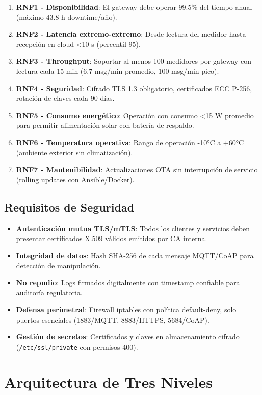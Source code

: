 \begin{enumerate}
    \item \textbf{RNF1 - Disponibilidad}: El gateway debe operar 99.5\% del tiempo anual (máximo 43.8 h downtime/año).
    \item \textbf{RNF2 - Latencia extremo-extremo}: Desde lectura del medidor hasta recepción en cloud <10 s (percentil 95).
    \item \textbf{RNF3 - Throughput}: Soportar al menos 100 medidores por gateway con lectura cada 15 min (6.7 msg/min promedio, 100 msg/min pico).
    \item \textbf{RNF4 - Seguridad}: Cifrado TLS 1.3 obligatorio, certificados ECC P-256, rotación de claves cada 90 días.
    \item \textbf{RNF5 - Consumo energético}: Operación con consumo <15 W promedio para permitir alimentación solar con batería de respaldo.
    \item \textbf{RNF6 - Temperatura operativa}: Rango de operación -10°C a +60°C (ambiente exterior sin climatización).
    \item \textbf{RNF7 - Mantenibilidad}: Actualizaciones OTA sin interrupción de servicio (rolling updates con Ansible/Docker).
\end{enumerate}

\subsection{Requisitos de Seguridad}

\begin{itemize}
    \item \textbf{Autenticación mutua TLS/mTLS}: Todos los clientes y servicios deben presentar certificados X.509 válidos emitidos por CA interna.
    \item \textbf{Integridad de datos}: Hash SHA-256 de cada mensaje MQTT/CoAP para detección de manipulación.
    \item \textbf{No repudio}: Logs firmados digitalmente con timestamp confiable para auditoría regulatoria.
    \item \textbf{Defensa perimetral}: Firewall iptables con política default-deny, solo puertos esenciales (1883/MQTT, 8883/HTTPS, 5684/CoAP).
    \item \textbf{Gestión de secretos}: Certificados y claves en almacenamiento cifrado (\texttt{/etc/ssl/private} con permisos 400).
\end{itemize}

\section{Arquitectura de Tres Niveles}

